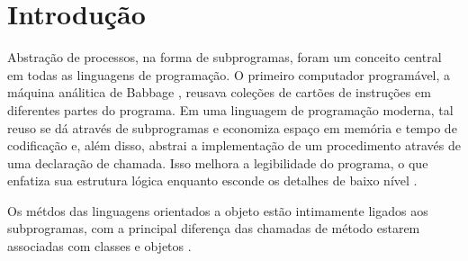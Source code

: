 
\section{Introdução} 
\label{sec:introducao}
Abstração de processos, na forma de subprogramas, foram 
um conceito central em todas as linguagens de programação.
O primeiro computador programável, a máquina análitica de Babbage \cite{babbage1910babbage},
reusava coleções de cartões de instruções em diferentes partes do programa.
Em uma linguagem de programação moderna, tal reuso se dá através de subprogramas
e economiza espaço em memória e tempo de codificação e, além disso,
abstrai a implementação de um procedimento através de uma declaração de chamada.
Isso melhora a legibilidade do programa, o que enfatiza sua estrutura lógica
enquanto esconde os detalhes de baixo nível \cite{sebesta}.

Os métdos das linguagens orientados a objeto estão intimamente ligados 
aos subprogramas, com a principal diferença das chamadas de método
estarem associadas com classes e objetos \cite{sebesta}.

